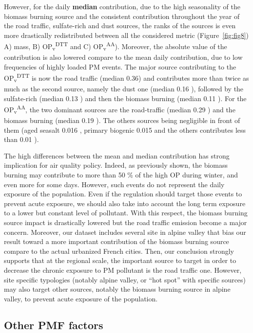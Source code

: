 \documentclass[acp]{copernicus}
\begin{document}
However, for the daily \textbf{median} contribution, due to the high
seasonality of the biomass burning source and the consistent
contribution throughout the year of the road traffic, sulfate-rich and
dust sources, the ranks of the sources is even more drastically
redistributed between all the considered metric
(Figure~\ref{fig:fig8}) A) mass, B)
OP\textsubscript{v}\textsuperscript{DTT} and C)
OP\textsubscript{v}\textsuperscript{AA}). Moreover, the absolute value
of the contribution is also lowered compare to the mean daily
contribution, due to low frequencies of highly loaded PM events. The
major source contributing to the
OP\textsubscript{v}\textsuperscript{DTT} is now the road traffic (median
0.36) and contributes more than twice as much as the second source,
namely the dust one (median 0.16 ), followed by the sulfate-rich (median
0.13 ) and then the biomass burning (median 0.11 ). For the
OP\textsubscript{v}\textsuperscript{AA}, the two dominant sources are
the road-traffic (median 0.29 ) and the biomass burning (median 0.19 ).
The others sources being negligible in front of them (aged seasalt 0.016
, primary biogenic 0.015 and the others contributes less than 0.01 ).

The high differences between the mean and median contribution has strong
implication for air quality policy. Indeed, as previously shown, the
biomass burning may contribute to more than 50 \% of the high OP during
winter, and even more for some days. However, such events do not
represent the daily exposure of the population. Even if the regulation
should target those events to prevent acute exposure, we should also
take into account the long term exposure to a lower but constant level
of pollutant. With this respect, the biomass burning source impact is
drastically lowered but the road traffic emission become a major
concern. Moreover, our dataset includes several site in alpine valley
that bias our result toward a more important contribution of the biomass
burning source compare to the actual urbanized French cities. Then, our
conclusion strongly supports that at the regional scale, the important
source to target in order to decrease the chronic exposure to PM
pollutant is the road traffic one. However, site specific typologies
(notably alpine valley, or ``hot spot'' with specific sources) may also
target other sources, notably the biomass burning source in alpine
valley, to prevent acute exposure of the population.

\subsection{Other PMF factors}%
\label{other-pmf-factors}
\end{document}
